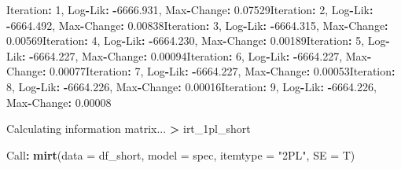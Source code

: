 \documentclass[
]{article}
\newenvironment{Shaded}{\begin{snugshade}}{\end{snugshade}}
\newcommand{\AttributeTok}[1]{\textcolor[rgb]{0.13,0.29,0.53}{#1}}
\newcommand{\DecValTok}[1]{\textcolor[rgb]{0.00,0.00,0.81}{#1}}
\newcommand{\FloatTok}[1]{\textcolor[rgb]{0.00,0.00,0.81}{#1}}
\newcommand{\FunctionTok}[1]{\textcolor[rgb]{0.13,0.29,0.53}{\textbf{#1}}}
\newcommand{\NormalTok}[1]{#1}
\newcommand{\SpecialCharTok}[1]{\textcolor[rgb]{0.81,0.36,0.00}{\textbf{#1}}}
\newcommand{\StringTok}[1]{\textcolor[rgb]{0.31,0.60,0.02}{#1}}
\begin{document}
\begin{Shaded}
\begin{Highlighting}[]
\NormalTok{Iteration}\SpecialCharTok{:} \DecValTok{1}\NormalTok{, Log}\SpecialCharTok{{-}}\NormalTok{Lik}\SpecialCharTok{:} \SpecialCharTok{{-}}\FloatTok{6666.931}\NormalTok{, Max}\SpecialCharTok{{-}}\NormalTok{Change}\SpecialCharTok{:} \FloatTok{0.07529}\NormalTok{Iteration}\SpecialCharTok{:} \DecValTok{2}\NormalTok{, Log}\SpecialCharTok{{-}}\NormalTok{Lik}\SpecialCharTok{:} \SpecialCharTok{{-}}\FloatTok{6664.492}\NormalTok{, Max}\SpecialCharTok{{-}}\NormalTok{Change}\SpecialCharTok{:} \FloatTok{0.00838}\NormalTok{Iteration}\SpecialCharTok{:} \DecValTok{3}\NormalTok{, Log}\SpecialCharTok{{-}}\NormalTok{Lik}\SpecialCharTok{:} \SpecialCharTok{{-}}\FloatTok{6664.315}\NormalTok{, Max}\SpecialCharTok{{-}}\NormalTok{Change}\SpecialCharTok{:} \FloatTok{0.00569}\NormalTok{Iteration}\SpecialCharTok{:} \DecValTok{4}\NormalTok{, Log}\SpecialCharTok{{-}}\NormalTok{Lik}\SpecialCharTok{:} \SpecialCharTok{{-}}\FloatTok{6664.230}\NormalTok{, Max}\SpecialCharTok{{-}}\NormalTok{Change}\SpecialCharTok{:} \FloatTok{0.00189}\NormalTok{Iteration}\SpecialCharTok{:} \DecValTok{5}\NormalTok{, Log}\SpecialCharTok{{-}}\NormalTok{Lik}\SpecialCharTok{:} \SpecialCharTok{{-}}\FloatTok{6664.227}\NormalTok{, Max}\SpecialCharTok{{-}}\NormalTok{Change}\SpecialCharTok{:} \FloatTok{0.00094}\NormalTok{Iteration}\SpecialCharTok{:} \DecValTok{6}\NormalTok{, Log}\SpecialCharTok{{-}}\NormalTok{Lik}\SpecialCharTok{:} \SpecialCharTok{{-}}\FloatTok{6664.227}\NormalTok{, Max}\SpecialCharTok{{-}}\NormalTok{Change}\SpecialCharTok{:} \FloatTok{0.00077}\NormalTok{Iteration}\SpecialCharTok{:} \DecValTok{7}\NormalTok{, Log}\SpecialCharTok{{-}}\NormalTok{Lik}\SpecialCharTok{:} \SpecialCharTok{{-}}\FloatTok{6664.227}\NormalTok{, Max}\SpecialCharTok{{-}}\NormalTok{Change}\SpecialCharTok{:} \FloatTok{0.00053}\NormalTok{Iteration}\SpecialCharTok{:} \DecValTok{8}\NormalTok{, Log}\SpecialCharTok{{-}}\NormalTok{Lik}\SpecialCharTok{:} \SpecialCharTok{{-}}\FloatTok{6664.226}\NormalTok{, Max}\SpecialCharTok{{-}}\NormalTok{Change}\SpecialCharTok{:} \FloatTok{0.00016}\NormalTok{Iteration}\SpecialCharTok{:} \DecValTok{9}\NormalTok{, Log}\SpecialCharTok{{-}}\NormalTok{Lik}\SpecialCharTok{:} \SpecialCharTok{{-}}\FloatTok{6664.226}\NormalTok{, Max}\SpecialCharTok{{-}}\NormalTok{Change}\SpecialCharTok{:} \FloatTok{0.00008}

\NormalTok{Calculating information matrix...}
\SpecialCharTok{\textgreater{}}\NormalTok{ irt\_1pl\_short}

\NormalTok{Call}\SpecialCharTok{:}
\FunctionTok{mirt}\NormalTok{(}\AttributeTok{data =}\NormalTok{ df\_short, }\AttributeTok{model =}\NormalTok{ spec, }\AttributeTok{itemtype =} \StringTok{"2PL"}\NormalTok{, }\AttributeTok{SE =}\NormalTok{ T)}


\end{Highlighting}
\end{Shaded}
\end{document}
